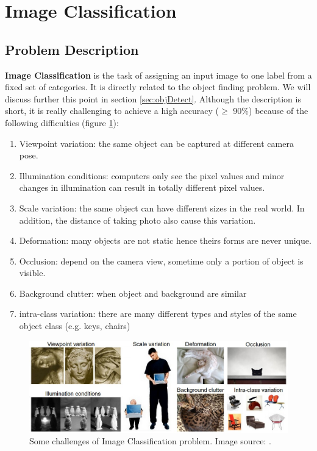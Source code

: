 \section{Image Classification}
\label{sec:imgClass}
\subsection{Problem Description}
\textbf{Image Classification} is the task of assigning an input image to one label from a fixed set of categories. It is directly related to the object finding problem. We will discuss further this point in section \ref{sec:objDetect}. Although the description is short, it is really challenging to achieve a high accuracy ($\geq$ 90\%) because of the following difficulties (figure \ref{fig:ImClasschallenges}):
\begin{enumerate}
	\item Viewpoint variation: the same object can be captured at different camera pose.
	\item Illumination conditions: computers only see the pixel values and minor changes in illumination can result in totally different pixel values. 
	\item Scale variation: the same object can have different sizes in the real world. In addition, the distance of taking photo also cause this variation.
	\item Deformation: many objects are not static hence theirs forms are never unique.
	\item Occlusion: depend on the camera view, sometime only a portion of object is visible.
	\item Background clutter: when object and background are similar
	\item intra-class variation: there are many different types and styles of the same object class (e.g. keys, chairs)
\end{enumerate}

\begin{figure}[tb]
\centering
\includegraphics[width =0.9\hsize]{./figures/ImClasschallenges}
\caption{Some challenges of Image Classification problem. Image source: \cite{cs231n}.}
\label{fig:ImClasschallenges}
\end{figure}
